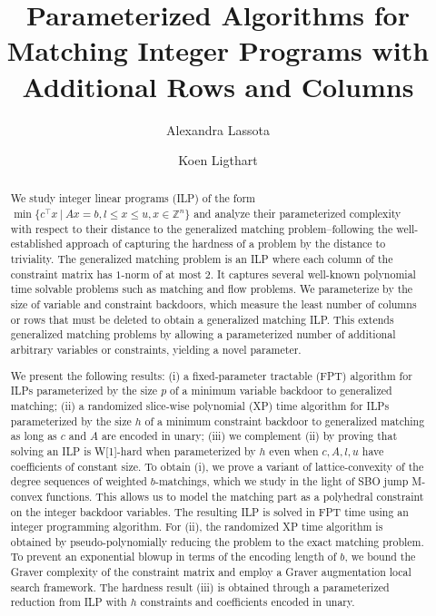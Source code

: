 \documentclass[a4paper,UKenglish,cleveref,thm-restate]{lipics-v2021}
\title{Parameterized Algorithms for Matching Integer Programs with Additional Rows and Columns}
\author{Alexandra Lassota}{Eindhoven University of Technology, Netherlands}{a.a.lassota@tue.nl}{https://orcid.org/0000-0001-6215-066X}{}
\author{Koen Ligthart}{Eindhoven University of Technology, Netherlands}{k.m.ligthart@tue.nl}{https://orcid.org/0009-0004-6823-5225}{}
\newcommand{\Z}{\mathbb Z}
\begin{document}
\maketitle

\begin{abstract}
We study integer linear programs (ILP) of the form $\min\{c^\top x\ \vert\ Ax=b,l\le x\le u,x\in\Z^n\}$ and analyze their parameterized complexity with respect to their distance to the generalized matching problem--following the well-established approach of capturing the hardness of a problem by the distance to triviality. The generalized matching problem is an ILP where each column of the constraint matrix has $1$-norm of at most $2$. It captures several well-known polynomial time solvable problems such as matching and flow problems. We parameterize by the size of variable and constraint backdoors, which measure the least number of columns or rows that must be deleted to obtain a generalized matching ILP. This extends generalized matching problems by allowing a parameterized number of additional arbitrary variables or constraints, yielding a novel parameter.

We present the following results: (i) a fixed-parameter tractable (FPT) algorithm for ILPs parameterized by the size $p$ of a minimum variable backdoor to generalized matching; (ii) a randomized slice-wise polynomial (XP) time algorithm for ILPs parameterized by the size $h$ of a minimum constraint backdoor to generalized matching as long as $c$ and $A$ are encoded in unary; (iii) we complement (ii) by proving that solving an ILP is W[1]-hard when parameterized by $h$ even when $c,A,l,u$ have coefficients of constant size. To obtain (i), we prove a variant of lattice-convexity of the degree sequences of weighted $b$-matchings, which we study in the light of SBO jump M-convex functions. This allows us to model the matching part as a polyhedral constraint on the integer backdoor variables. The resulting ILP is solved in FPT time using an integer programming algorithm. For (ii), the randomized XP time algorithm is obtained by pseudo-polynomially reducing the problem to the exact matching problem. To prevent an exponential blowup in terms of the encoding length of $b$, we bound the Graver complexity of the constraint matrix and employ a Graver augmentation local search framework. The hardness result (iii) is obtained through a parameterized reduction from ILP with $h$ constraints and coefficients encoded in unary. \end{abstract}
\end{document}
